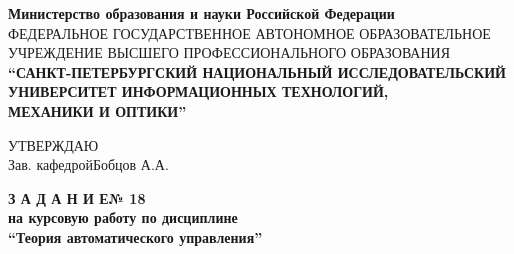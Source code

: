 \documentclass[fleqn, a4paper, 12pt, russian]{article}
\begin{document}
	\centering
	{\fontsize{14pt}{5cm}\selectfont \bfseries Министерство образования и науки Российской Федерации} \\ \vspace{0.5cm}
	{\fontsize{6.8pt}{5cm}\selectfont ФЕДЕРАЛЬНОЕ ГОСУДАРСТВЕННОЕ АВТОНОМНОЕ ОБРАЗОВАТЕЛЬНОЕ УЧРЕЖДЕНИЕ ВЫСШЕГО ПРОФЕССИОНАЛЬНОГО ОБРАЗОВАНИЯ} \\ 
	\vspace{0.5cm}
	{\fontsize{13pt}{5cm}\selectfont \bfseries “САНКТ-ПЕТЕРБУРГСКИЙ НАЦИОНАЛЬНЫЙ ИССЛЕДОВАТЕЛЬСКИЙ УНИВЕРСИТЕТ ИНФОРМАЦИОННЫХ ТЕХНОЛОГИЙ,} \\ \vspace{0.1cm}
	{\fontsize{13pt}{5cm}\selectfont \bfseries МЕХАНИКИ И ОПТИКИ”} \\ \vspace{1cm}
	
	\flushleft
	{\fontsize{12pt}{0cm} \hspace{1.6cm}УТВЕРЖДАЮ} \\ \vspace{0.1cm}
	{\fontsize{12pt}{0cm}\selectfont \hspace{10.5cm}Зав. кафедрой\hspace{0.6cm}Бобцов А.А.} \\ \vspace{1cm}
	
	\centering
	{\fontsize{18pt}{0cm}\selectfont \bfseries З А Д А Н И Е\hspace{0.2cm}№ 18}\\ \vspace{0.2cm}
	{\fontsize{16pt}{0cm}\selectfont \bfseries на курсовую работу по дисциплине}	\\ \vspace{0.2cm}
	{\fontsize{16pt}{0cm}\selectfont \bfseries \enquote{Теория автоматического управления}} \\ \vspace{1cm}
	
\end{document}
